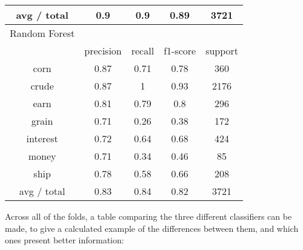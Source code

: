 \documentclass[11pt]{article}
\begin{document}
\begin{center}
\begin{longtable}{| c | c | c | c | c |}
 avg / total   & 0.9       & 0.9    & 0.89     & 3721    \\
\hline
Random Forest &           &        &          &         \\
\hline
             & precision & recall & f1-score & support \\
corn          & 0.87      & 0.71   & 0.78     & 360     \\
crude         & 0.87      & 1      & 0.93     & 2176    \\
earn          & 0.81      & 0.79   & 0.8      & 296     \\
grain         & 0.71      & 0.26   & 0.38     & 172     \\
interest      & 0.72      & 0.64   & 0.68     & 424     \\
money         & 0.71      & 0.34   & 0.46     & 85      \\
ship          & 0.78      & 0.58   & 0.66     & 208     \\
 avg / total   & 0.83      & 0.84   & 0.82     & 3721    \\
\hline
\end{longtable}
\end{center}

Across all of the folds, a table comparing the three different classifiers can be made, to give a calculated example of the differences between them, and which ones present better information:
\end{document}
